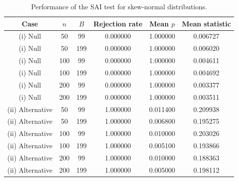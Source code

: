 \begin{table}[htbp]
\centering
\caption{Performance of the SAI test for skew-normal distributions.}
\label{tab:skew-obvious}
\begin{tabular}{cccccc}
\hline
Case & $n$ & $B$ & Rejection rate & Mean $p$ & Mean statistic \\
\hline
(i) Null & 50 & 99 & 0.000000 & 1.000000 & 0.006727 \\
(i) Null & 50 & 199 & 0.000000 & 1.000000 & 0.006020 \\
(i) Null & 100 & 99 & 0.000000 & 1.000000 & 0.004611 \\
(i) Null & 100 & 199 & 0.000000 & 1.000000 & 0.004692 \\
(i) Null & 200 & 99 & 0.000000 & 1.000000 & 0.003377 \\
(i) Null & 200 & 199 & 0.000000 & 1.000000 & 0.003511 \\
(ii) Alternative & 50 & 99 & 1.000000 & 0.011400 & 0.209938 \\
(ii) Alternative & 50 & 199 & 1.000000 & 0.006800 & 0.195275 \\
(ii) Alternative & 100 & 99 & 1.000000 & 0.010000 & 0.203026 \\
(ii) Alternative & 100 & 199 & 1.000000 & 0.005100 & 0.193866 \\
(ii) Alternative & 200 & 99 & 1.000000 & 0.010000 & 0.188363 \\
(ii) Alternative & 200 & 199 & 1.000000 & 0.005000 & 0.198112 \\
\hline
\end{tabular}
\end{table}
